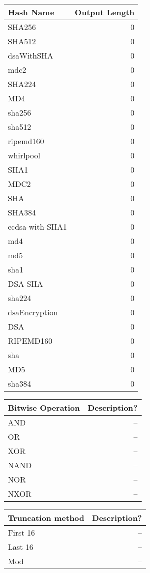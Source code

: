 \documentclass[bsc,frontabs,twoside,singlespacing,parskip,deptreport]{infthesis}     %
\begin{document}
\begin{center}
\begin{tabular}{|l|r|}
\hline
Hash Name & Output Length\\
\hline
SHA256 & 0 \\
SHA512 & 0 \\
dsaWithSHA & 0 \\
mdc2 & 0 \\
SHA224 & 0 \\
MD4 & 0 \\
sha256 & 0 \\
sha512 & 0 \\
ripemd160 & 0 \\
whirlpool & 0 \\
SHA1 & 0 \\
MDC2 & 0 \\
SHA & 0 \\
SHA384 & 0 \\
ecdsa-with-SHA1 & 0 \\
md4 & 0 \\
md5 & 0 \\
sha1 & 0 \\
DSA-SHA & 0 \\
sha224 & 0 \\
dsaEncryption & 0 \\
DSA & 0 \\
RIPEMD160 & 0 \\
sha & 0 \\
MD5 & 0 \\
sha384 & 0 \\
\hline
\end{tabular}
\end{center}

\begin{center}
\begin{tabular}{|l|r|}
\hline
Bitwise Operation & Description?\\
\hline
AND & --\\
OR & -- \\
XOR & --\\
NAND & -- \\
NOR & -- \\
NXOR & -- \\
\hline
\end{tabular}
\end{center}

\begin{center}
\begin{tabular}{|l|r|}
\hline
Truncation method & Description?\\
\hline
First 16 & --\\
Last 16 & --\\
Mod & --\\
\hline
\end{tabular}
\end{center}
\end{document}
